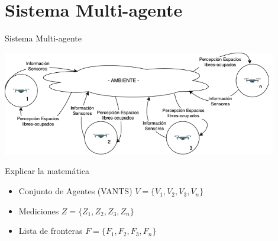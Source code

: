 \documentclass[
  24pt, %
  aspectratio=169, %
]{beamer}
\begin{document}
\section{Sistema Multi-agente}
\begin{frame}{Sistema Multi-agente}

  \bigskip %
  \centering
  \includegraphics[width=12cm]{problema}\\
  
\end{frame}

\begin{frame}
  Explicar la matemática
  \bigskip %
  \begin{itemize}
  \item Conjunto de Agentes (VANTS) $V = \{V_1,V_2,V_3,V_n\}$
  \item Mediciones $Z = \{Z_1,Z_2,Z_3,Z_n\}$
  \item Lista de fronteras $F = \{F_1,F_2,F_3,F_n\}$
  \end{itemize}
\end{frame}
\end{document}
